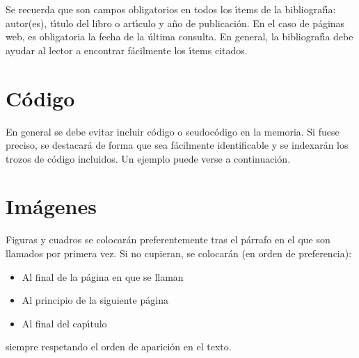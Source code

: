 Se recuerda que son campos obligatorios
en todos los {\'\i}tems de la bibliograf{\'\i}a: 
autor(es), t{\'\i}tulo del libro o art{\'\i}culo 
y a{\~n}o de publicaci\'on.
En el caso de p\'aginas web, 
es obligatoria la fecha de la \'ultima consulta. 
En general, la bibliograf{\'\i}a debe ayudar al lector a encontrar f\'acilmente los {\'\i}tems citados.

\section{C\'odigo}

En general se debe evitar incluir c\'odigo o seudoc\'odigo en la memoria. Si fuese preciso, se destacar\'a de forma
que sea f\'acilmente identificable y se indexar\'an los trozos de c\'odigo incluidos. Un ejemplo puede verse
a continuaci\'on.


\section{Im\'agenes}


Figuras y cuadros se colocar\'an preferentemente tras el p\'arrafo en el que
son llamados por primera vez. Si no cupieran, se colocar\'an (en orden de preferencia):
\begin{itemize}
 \item Al final de la p\'agina en que se llaman
 \item Al principio de la siguiente p\'agina
 \item Al final del cap{\'\i}tulo
\end{itemize}
siempre respetando el orden de aparici\'on en el texto.